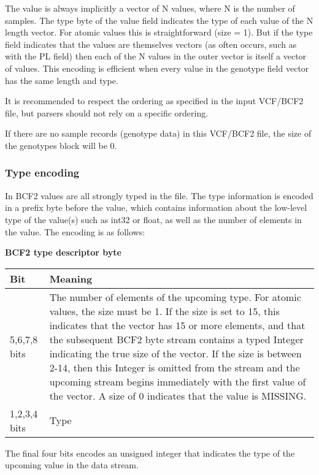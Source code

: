 \documentclass[8pt]{article}
\begin{document}
The value is always implicitly a vector of N values, where N is the number of samples.  The type byte of the value field indicates the type of each value of the N length vector.  For atomic values this is straightforward (size = 1).  But if the type field indicates that the values are themselves vectors (as often occurs, such as with the PL field) then each of the N values in the outer vector is itself a vector of values.  This encoding is efficient when every value in the genotype field vector has the same length and type.

It is recommended to respect the ordering as specified in the input VCF/BCF2 file, but parsers should not rely on a specific ordering.

If there are no sample records (genotype data) in this VCF/BCF2 file, the size of the genotypes block will be 0.


\subsubsection{Type encoding}
\label{BcfTypeEncoding}

In BCF2 values are all strongly typed in the file.  The type information is encoded in a prefix byte before the value, which contains information about the low-level type of the value(s) such as int32 or float, as well as the number of elements in the value.  The encoding is as follows:

\vspace{0.3cm}
\textbf{BCF2 type descriptor byte}

\vspace{0.3cm}
\begin{tabular}{|p{2cm} | p{10cm}|} \hline
Bit & Meaning \\ \hline
5,6,7,8 bits & The number of elements of the upcoming type.  For atomic values, the size must be 1.  If the size is set to 15, this indicates that the vector has 15 or more elements, and that the subsequent BCF2 byte stream contains a typed Integer indicating the true size of the vector.  If the size is between 2-14, then this Integer is omitted from the stream and the upcoming stream begins immediately with the first value of the vector.  A size of 0 indicates that the value is MISSING. \\ \hline
1,2,3,4 bits & Type \\ \hline
\end{tabular}
\vspace{0.3cm}

The final four bits encodes an unsigned integer that indicates the type of the upcoming value in the data stream.
\end{document}
